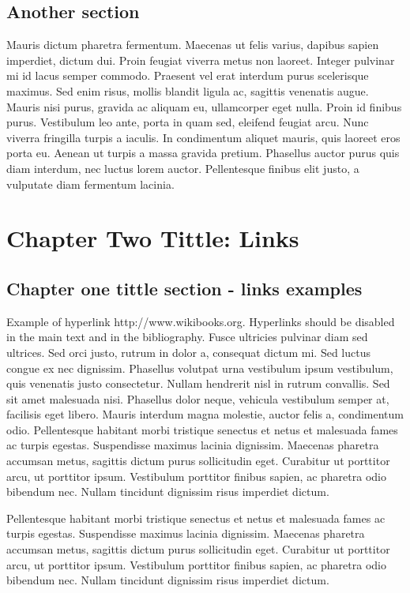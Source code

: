 \section{Another section}
Mauris dictum pharetra fermentum. Maecenas ut felis varius, dapibus sapien imperdiet, dictum dui. Proin feugiat viverra metus non laoreet. Integer pulvinar mi id lacus semper commodo. Praesent vel erat interdum purus scelerisque maximus. Sed enim risus, mollis blandit ligula ac, sagittis venenatis augue. Mauris nisi purus, gravida ac aliquam eu, ullamcorper eget nulla. Proin id finibus purus. Vestibulum leo ante, porta in quam sed, eleifend feugiat arcu. Nunc viverra fringilla turpis a iaculis. In condimentum aliquet mauris, quis laoreet eros porta eu. Aenean ut turpis a massa gravida pretium. Phasellus auctor purus quis diam interdum, nec luctus lorem auctor. Pellentesque finibus elit justo, a vulputate diam fermentum lacinia. 

\chapter{Chapter Two Tittle: Links}
\section{Chapter one tittle section - links examples}
Example of hyperlink http://www.wikibooks.org. Hyperlinks should be disabled in the main text and in the bibliography. Fusce ultricies pulvinar diam sed ultrices. Sed orci justo, rutrum in dolor a, consequat dictum mi. Sed luctus congue ex nec dignissim. Phasellus volutpat urna vestibulum ipsum vestibulum, quis venenatis justo consectetur. Nullam hendrerit nisl in rutrum convallis. Sed sit amet malesuada nisi. Phasellus dolor neque, vehicula vestibulum semper at, facilisis eget libero. Mauris interdum magna molestie, auctor felis a, condimentum odio. Pellentesque habitant morbi tristique senectus et netus et malesuada fames ac turpis egestas. Suspendisse maximus lacinia dignissim. Maecenas pharetra accumsan metus, sagittis dictum purus sollicitudin eget. Curabitur ut porttitor arcu, ut porttitor ipsum. Vestibulum porttitor finibus sapien, ac pharetra odio bibendum nec. Nullam tincidunt dignissim risus imperdiet dictum.

Pellentesque habitant morbi tristique senectus et netus et malesuada fames ac turpis egestas. Suspendisse maximus lacinia dignissim. Maecenas pharetra accumsan metus, sagittis dictum purus sollicitudin eget. Curabitur ut porttitor arcu, ut porttitor ipsum. Vestibulum porttitor finibus sapien, ac pharetra odio bibendum nec. Nullam tincidunt dignissim risus imperdiet dictum.
